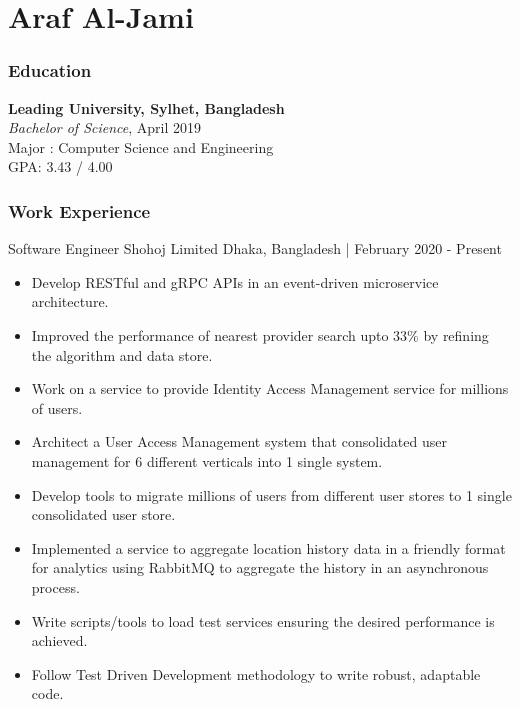 \documentclass{resumestyle}
\begin{document}
\large%

\part{Araf Al-Jami}

\section{Education}%

\textbf{Leading University, Sylhet, Bangladesh}\\%
\textit{Bachelor of Science}, April 2019\\%
Major : Computer Science and Engineering\\%
GPA: 3.43 / 4.00%

\section{Work Experience}%
    \worksubsection%
        {Software Engineer}%
        {Shohoj Limited}%
        {Dhaka, Bangladesh | February 2020 - Present}%
    
    \begin{itemize}[labelsep=4pt,leftmargin=*,topsep=5pt,partopsep=0pt,itemsep=1pt]%
        \item Develop RESTful and gRPC APIs in an event-driven microservice architecture.%
        \item Improved the performance of nearest provider search upto 33\% by refining the algorithm and data store.
        \item Work on a service to provide Identity Access Management service for millions of users.%
        \item Architect a User Access Management system that consolidated user management for 6 different verticals into 1 single system.%
        \item Develop tools to migrate millions of users from different user stores to 1 single consolidated user store.%
        \item Implemented a service to aggregate location history data in a friendly format for analytics using RabbitMQ to aggregate the history in an asynchronous process.%
        \item Write scripts/tools to load test services ensuring the desired performance is achieved.%
        \item Follow Test Driven Development methodology to write robust, adaptable code.%
    \end{itemize}%
\end{document}
